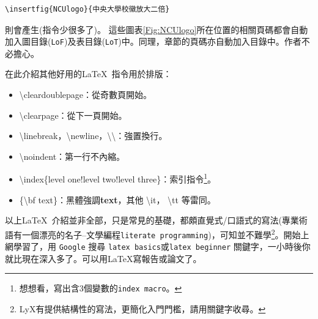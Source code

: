 \begin{Verbatim}[frame=single,firstline=1,label={Macro usage}]
\insertfig{NCUlogo}{中央大學校徽放大二倍}
\end{Verbatim}
則會產生(指令少很多了)。
這些圖表\ref{Fig:NCUlogo}所在位置的相關頁碼都會自動加入圖目錄({\tt LoF})及表目錄({\tt LoT})中。同理，章節的頁碼亦自動加入目錄中。作者不必擔心。


在此介紹其他好用的\LaTeX\ 指令用於排版：
\begin{itemize}
\item \textbackslash cleardoublepage：從奇數頁開始。 
\item \textbackslash clearpage：從下一頁開始。       
\item \textbackslash linebreak，\textbackslash newline，\textbackslash\textbackslash：強置換行。  
\item \textbackslash noindent：第一行不內縮。        
\item \textbackslash index\{level one!level two!level three\}：索引指令\footnote{想想看，寫出含3個變數的{\tt index macro}。}。
\item \{\textbackslash bf text\}：黑體強調{\bf text}，其他 \textbackslash it， \textbackslash tt 等雷同。
\end{itemize}
以上\LaTeX\ 介紹並非全部，只是常見的基礎，都頗直覺式/口語式的寫法(專業術語有一個漂亮的名子--文學編程{\tt literate programming})，可知並不難學\footnote{LyX有提供結構性的寫法，更簡化入門門檻，請用關鍵字收尋。}。開始上網學習了，用 {\tt Google} 搜尋 {\tt latex basics}或{\tt latex beginner} 關鍵字，一小時後你就比現在深入多了。可以用\LaTeX{}寫報告或論文了。

